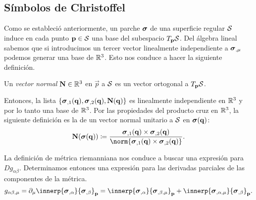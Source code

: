 \subsection{Símbolos de Christoffel}
Como se estableció anteriormente, un parche $\boldsymbol{\sigma}$ de una superficie regular $\mathcal S$ induce en cada punto $\mathbf p \in \mathcal S$ una base del subespacio $T_{\mathbf p}\mathcal S$. Del álgebra lineal sabemos que si introducimos un tercer vector linealmente independiente a $\boldsymbol{\sigma}_{,\mu}$ podemos generar una base de $\mathbb R^3$. Esto nos conduce a hacer la siguiente definición.
\begin{definition}
	Un \emph{vector normal} $\mathbf N \in \mathbb R^3$ en $\vec p$ a $\mathcal S$ es un vector ortogonal a $T_\mathbf p\mathcal S$.
\end{definition}
Entonces, la lista $\{\boldsymbol{\sigma}_{,1}(\mathbf q), \boldsymbol{\sigma}_{,2}(\mathbf q), \mathbf N(\mathbf q)\}$ es linealmente independiente en $\mathbb R^3$ y por lo tanto una base de $\mathbb R^3$.
Por las propiedades del producto cruz en $\mathbb R^3$, la siguiente definición es la de un vector normal unitario a $\mathcal S$ en $\boldsymbol{\sigma}(\mathbf q)$:
\begin{equation}
	\vec N(\patch(\vec q)) \coloneqq \frac{\patch_{,1}(\vec q) \times \patch_{,2}(\vec q)}{\norm{\patch_{,1}(\vec q) \times \patch_{,2}(\vec q)}}.
\end{equation}

La definición de métrica riemanniana nos conduce a buscar una expresión para $D g_{\alpha\beta}$. Determinamos entonces una expresión para las derivadas parciales de las componentes de la métrica.
\begin{equation}
	g_{\alpha\beta, \mu} = \partial_\mu \innerp{\patch_{,\alpha}}{\patch_{,\beta}}_{\vec p}
	= \innerp{\patch_{,\alpha}}{\patch_{,\beta,\mu}}_{\vec p} + \innerp{\patch_{,\alpha, \mu}}{\patch_{,\beta}}_{\vec p}.
\end{equation}

